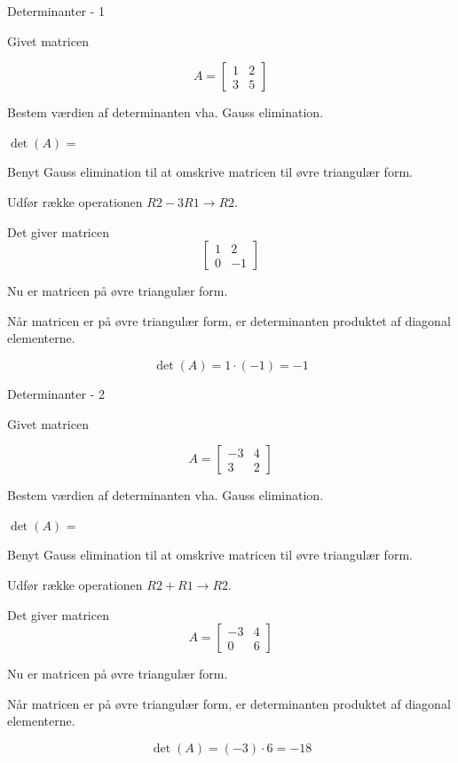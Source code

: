 \documentclass{article}
\begin{document}
\tableofcontents
\newpage

\begin{exercise}{Determinanter - 1}

Givet matricen

\[
A = \left[\begin{array}{rr}
1 & 2 \\
3 & 5
\end{array} \right]
\]

Bestem værdien af determinanten vha. Gauss elimination.

$\det(A)$ = 

\hint
Benyt Gauss elimination til at omskrive matricen til
øvre triangulær form.

\hint
Udfør række operationen
$R2 - 3R1 \to R2$.

\hint
Det giver matricen
\[
\left[\begin{array}{rr}
1 & 2 \\
0 & -1
\end{array} \right]
\]

\hint
Nu er matricen på øvre triangulær form.

\hint
Når matricen er på øvre triangulær form, er determinanten
produktet af diagonal elementerne.

\hint
\[
\det(A) = 1 \cdot (-1) = -1
\]


\end{exercise}


\begin{exercise}{Determinanter - 2}

Givet matricen

\[
A = \left[\begin{array}{rr}
-3 & 4 \\
3 & 2
\end{array} \right]
\]

Bestem værdien af determinanten vha. Gauss elimination.

$\det(A)$ = 

\hint
Benyt Gauss elimination til at omskrive matricen til
øvre triangulær form.

\hint
Udfør række operationen
$R2 + R1 \to R2$.

\hint
Det giver matricen
\[
A = \left[\begin{array}{rr}
-3 & 4 \\
0 & 6
\end{array} \right]
\]

\hint
Nu er matricen på øvre triangulær form.

\hint
Når matricen er på øvre triangulær form, er determinanten
produktet af diagonal elementerne.

\hint
\[
\det(A) = (-3) \cdot 6 = -18
\]


\end{exercise}
\end{document}
